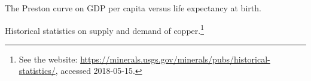 \documentclass[a4paper,oneside,12pt]{article}
\begin{document}
\begin{problem}
{\begin{solution}
\end{solution}
}{}

\item The Preston curve on GDP per capita versus life expectancy at
  birth.

\item Historical statistics on supply and demand of copper.\footnote{
    See the website:
    \url{https://minerals.usgs.gov/minerals/pubs/historical-statistics/},
    accessed 2018-05-15.
  }
\end{problem}
\end{document}
